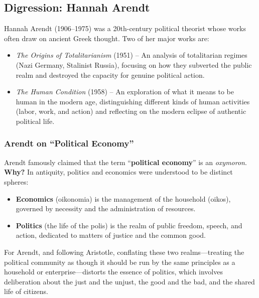             \subsection{Digression: Hannah Arendt}

                Hannah Arendt (1906–1975) was a 20th-century political theorist whose works often draw on ancient Greek thought. Two of her major works are:
\vspace{-0.05cm}
                    \begin{itemize}
                        \item \textit{The Origins of Totalitarianism} (1951) – An analysis of totalitarian regimes (Nazi Germany, Stalinist Russia), focusing on how they subverted the public realm and destroyed the capacity for genuine political action.
                        \item \textit{The Human Condition} (1958) – An exploration of what it means to be human in the modern age, distinguishing different kinds of human activities (labor, work, and action) and reflecting on the modern eclipse of authentic political life.
                    \end{itemize}

                \subsubsection{Arendt on “Political Economy”}

                    Arendt famously claimed that the term “\textbf{political economy}” is an \textit{oxymoron}. \textbf{Why?} In antiquity, politics and economics were understood to be distinct spheres:
                            \begin{itemize}
                                \item \textbf{Economics} (oikonomia) is the management of the household (oikos), governed by necessity and the administration of resources.
                                \item \textbf{Politics} (the life of the polis) is the realm of public freedom, speech, and action, dedicated to matters of justice and the common good.
                            \end{itemize}

                    For Arendt, and following Aristotle, conflating these two realms—treating the political community as though it should be run by the same principles as a household or enterprise—distorts the essence of politics, which involves deliberation about the just and the unjust, the good and the bad, and the shared life of citizens.
\vspace{-0.25cm}
